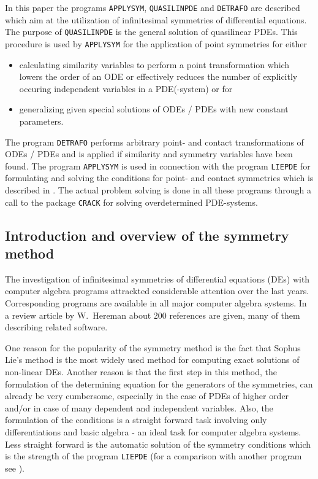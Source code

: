 
In this paper the programs \texttt{APPLYSYM}, \texttt{QUASILINPDE} and
\texttt{DETRAFO} are described which aim at the utilization
of infinitesimal symmetries of differential equations. The purpose
of \texttt{QUASILINPDE} is the general solution of
quasilinear PDEs. This procedure is used by \texttt{APPLYSYM}
for the application of point symmetries for either
\begin{itemize}
\item calculating similarity variables to perform a point transformation
which lowers the order of an ODE or effectively reduces the number of
explicitly occuring independent variables in a PDE(-system) or for
\item generalizing given special solutions of ODEs / PDEs with new constant
parameters.
\end{itemize}

The program \texttt{DETRAFO} performs arbitrary point- and contact
transformations of ODEs / PDEs and is applied if similarity
and symmetry variables have been found.
The program \texttt{APPLYSYM} is used in connection with the program
\texttt{LIEPDE} for formulating and solving the conditions for point- and
contact symmetries which is described in \cite{Wolf:93}.
The actual problem solving is done in all these programs through a call
to the package \texttt{CRACK} for solving overdetermined PDE-systems.

\subsection{Introduction and overview of the symmetry method}
The investigation of infinitesimal symmetries of differential equations
(DEs) with computer algebra programs attrackted considerable attention
over the last years. Corresponding programs are available in all
major computer algebra systems. In a review article by W.\ Hereman
\cite{Hereman:95} about 200 references are given, many of them describing related
software.

One reason for the popularity of the symmetry method
is the fact that Sophus Lie's method
\cite{Lie:1880,Lie:1967} is the most widely
used method for computing exact solutions of non-linear DEs. Another reason is
that the first step in this
method, the formulation of the determining equation for the generators
of the symmetries, can already be very cumbersome, especially in the
case of PDEs of higher order and/or in case of many dependent and independent
variables. Also, the formulation of the conditions is a straight forward
task involving only differentiations and basic algebra - an ideal task for
computer algebra systems. Less straight forward is the automatic solution
of the symmetry conditions which is the strength of the program \texttt{LIEPDE}
(for a comparison with another program see \cite{Wolf:93}).

